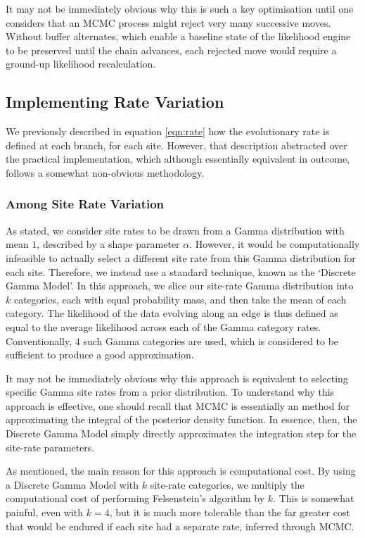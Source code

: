 \documentclass[10pt,journal,compsoc]{IEEEtran}
\begin{document}
It may not be immediately obvious why this is such a key optimisation until one considers that an MCMC process might reject very many successive moves. Without buffer alternates, which enable a baseline state of the likelihood engine to be preserved until the chain advances, each rejected move would require a ground-up likelihood recalculation.

\subsection{Implementing Rate Variation}

We previously described in equation \eqref{eqn:rate} how the evolutionary rate is defined at each branch, for each site. However, that description abstracted over the practical implementation, which although essentially equivalent in outcome, follows a somewhat non-obvious methodology.

\subsubsection{Among Site Rate Variation}

As stated, we consider site rates to be drawn from a Gamma distribution with mean $1$, described by a shape parameter $\alpha$. However, it would be computationally infeasible to actually select a different site rate from this Gamma distribution for each site. Therefore, we instead use a standard technique, known as the `Discrete Gamma Model'. In this approach, we slice our site-rate Gamma distribution into $k$ categories, each with equal probability mass, and then take the mean of each category. The likelihood of the data evolving along an edge is thus defined as equal to the average likelihood across each of the Gamma category rates. Conventionally, $4$ such Gamma categories are used, which is considered to be sufficient to produce a good approximation\cite{yang1994maximum}.

It may not be immediately obvious why this approach is equivalent to selecting specific Gamma site rates from a prior distribution. To understand why this approach is effective, one should recall that MCMC is essentially an method for approximating the integral of the posterior density function. In essence, then, the Discrete Gamma Model simply directly approximates the integration step for the site-rate parameters.

As mentioned, the main reason for this approach is computational cost. By using a Discrete Gamma Model with $k$ site-rate categories, we multiply the computational cost of performing Felsenstein's algorithm by $k$. This is somewhat painful, even with $k=4$, but it is much more tolerable than the far greater cost that would be endured if each site had a separate rate, inferred through MCMC.
\end{document}

